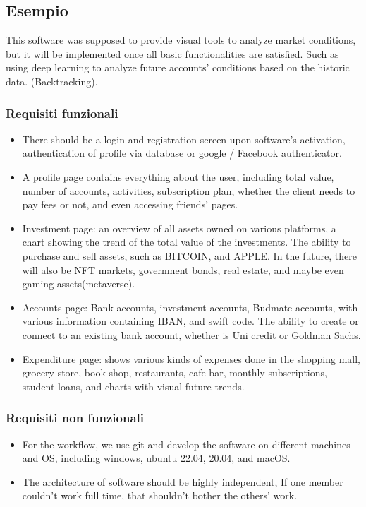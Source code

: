 \documentclass[a4paper,12pt]{report}
\begin{document}
\subsection*{Esempio}
This software was supposed to provide visual tools to analyze market conditions, but it will be implemented once all basic functionalities are satisfied.
%
Such as using deep learning to analyze future accounts' conditions based on the historic data. (Backtracking).

\subsubsection{Requisiti funzionali}
\begin{itemize}
	\item There should be a login and registration screen upon software's activation, authentication of profile via database or google / Facebook authenticator.
    \item A profile page contains everything about the user, including total value, number of accounts, activities, subscription plan, whether the client needs to pay fees or not, and even accessing friends' pages.
    \item Investment page: an overview of all assets owned on various platforms, a chart showing the trend of the total value of the investments. The ability to purchase and sell assets, such as BITCOIN, and APPLE. In the future, there will also be NFT markets, government bonds, real estate, and maybe even gaming assets(metaverse).
    \item Accounts page: Bank accounts, investment accounts, Budmate accounts, with various information containing IBAN, and swift code. 
    The ability to create or connect to an existing bank account, whether is Uni credit or Goldman Sachs.
    \item Expenditure page:  shows various kinds of expenses done in the shopping mall, grocery store, book shop, restaurants, cafe bar, monthly subscriptions, student loans, and charts with visual future trends.
\end{itemize}

\subsubsection{Requisiti non funzionali}
\begin{itemize}
    \item For the workflow, we use git and develop the software on different machines and OS, including windows, ubuntu 22.04, 20.04, and macOS. 
    \item The architecture of software should be highly independent, If one member couldn't work full time, that shouldn't bother the others' work.
\end{itemize}
\end{document}
